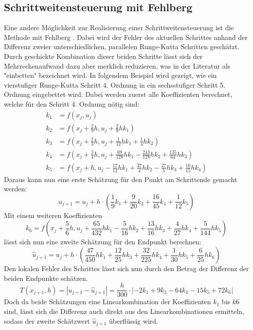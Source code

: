 \subsection{Schrittweitensteuerung mit Fehlberg
  \label{steps:subsection:fehlberg}}
Eine andere Möglichkeit zur Realisierung einer Schrittweitensteuerung ist die Methode mit Fehlberg
\cite{steps:Numerische-Mathematik}.
Dabei wird der Fehler des aktuellen Schrittes anhand der Differenz zweier unterschiedlichen, parallelen
Runge-Kutta Schritten geschätzt. Durch geschickte Kombination dieser beiden Schritte
lässt sich der Mehrrechenaufwand dazu aber merklich reduzieren, was in der Literatur als "einbetten" bezeichnet wird.
In folgendem Beispiel wird gezeigt, wie ein vierstufiger Runge-Kutta Schritt 4. Ordnung in ein sechsstufiger Schritt 5. Ordnung eingebettet wird.
Dabei werden zuerst alle Koeffizienten berechnet, welche für den Schritt 4. Ordnung nötig sind:
\begin{align*}
  k_1 & =f(x_j, u_j)                                                                           \\
  k_2 & =f(x_j + \frac{2}{9}h, u_j+\frac{2}{9}hk_1)                                            \\
  k_3 & =f(x_j + \frac{1}{3}h, u_j+\frac{1}{12}hk_1+\frac{1}{4}hk_2)                           \\
  k_4 & =f(x_j + \frac{3}{4}h, u_j+\frac{69}{128}hk_1-\frac{243}{128}hk_2+\frac{135}{64}hk_3)  \\
  k_5 & =f(x_j + h, u_j-\frac{17}{12}hk_1+\frac{27}{4}hk_2-\frac{27}{5}hk_3+\frac{16}{15}hk_4)
\end{align*}
Daraus kann nun eine erste Schätzung für den Punkt am Schrittende gemacht werden:
\[
  u_{j+1} =u_j +h\cdot(\frac{1}{9}k_1+\frac{9}{20}k_3+\frac{16}{45}k_4+\frac{1}{12}k_5)
\]
Mit einem weiteren Koeffizienten
\[
  k_6 =f(x_j + \frac{5}{6}h, u_j+\frac{65}{432}hk_1-\frac{5}{16}hk_2+\frac{13}{16}hk_3+\frac{4}{27}hk_4+\frac{5}{144}hk_5)
\]
lässt sich nun eine zweite Schätzung für den Endpunkt berechnen:
\[
  \hat{u}_{j+1} =u_j+h\cdot(\frac{47}{450}hk_1+\frac{12}{25}hk_3+\frac{32}{225}hk_4+\frac{1}{30}hk_5+\frac{6}{25}hk_6)
\]
Den lokalen Fehler des Schrittes lässt sich nun durch den Betrag der Differenz der beiden Endpunkte schätzen.
\[
  T(x_{j+1},h)=|u_{j+1}-\hat{u}_{j+1}|=\frac{h}{300}\cdot|-2k_1+9k_3-64k_4-15k_5+72k_6|
\]
Doch da beide Schätzungen eine Linearkombination der Koeffizienten $k_1$ bis $k6$ sind,
lässt sich die Differenz auch direkt aus den Linearkombinationen ermitteln,
sodass der zweite Schätzwert $\hat{u}_{j+1}$ überflüssig wird.

